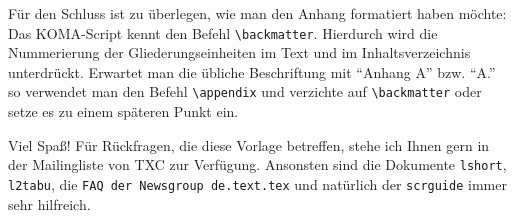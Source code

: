 \documentclass[a4paper,
	twoside,
	openany,							%
	headsepline,					%
	footsepline,					%
	headings = normal,
	toc  	 = chapterentrywithdots,
	listof = totoc,
	listof = entryprefix,
	bibliography = totoc	%
]
{scrbook}
\begin{document}
Für den Schluss ist zu überlegen, wie man den Anhang formatiert haben möchte: Das KOMA-Script kennt den Befehl \verb#\backmatter#. Hierdurch wird die Nummerierung der Gliederungseinheiten im Text und im Inhaltsverzeichnis unterdrückt. Erwartet man die übliche Beschriftung mit "`Anhang A"' bzw. "`A."' so verwendet man den Befehl \verb#\appendix# und verzichte auf \verb#\backmatter# oder setze es zu einem späteren Punkt ein.

Viel Spaß! Für Rückfragen, die diese Vorlage betreffen, stehe ich Ihnen gern in der Mailingliste von TXC zur Verfügung. Ansonsten sind die Dokumente \texttt{lshort}, \texttt{l2tabu}, die \texttt{FAQ der Newsgroup de.text.tex} und natürlich der \texttt{scrguide} immer sehr hilfreich.


\listoffigures				%
\listoftables				%

%
\nocite{*}
\printbibheading[title={Quellenverzeichnis}]
\printbibliography[type = book, heading	= subbibliography, title = {Bücher}]
\end{document}
